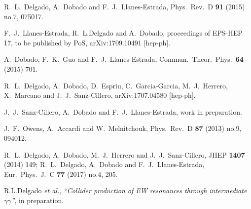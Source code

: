\documentclass{PoS}
\begin{document}
\begin{thebibliography}{99}



  R.~L.~Delgado, A.~Dobado and F.~J.~Llanes-Estrada,
  Phys.\ Rev.\ D {\bf 91} (2015) no.7,  075017.

  F.~J.~Llanes-Estrada, R.~L.Delgado and A.~Dobado,
  proceedings of EPS-HEP 17, to be published by PoS,
  arXiv:1709.10491 [hep-ph].


  A.~Dobado, F.~K.~Guo and F.~J.~Llanes-Estrada,
  Commun.\ Theor.\ Phys.\  {\bf 64} (2015) 701.



  R.~L.~Delgado, A.~Dobado, D.~Espriu, C.~Garcia-Garcia, M.~J.~Herrero, X.~Marcano and J.~J.~Sanz-Cillero,
  arXiv:1707.04580 [hep-ph].

J.~J.~Sanz-Cillero, A.~Dobado and F.~J.~Llanes-Estrada, 
work in preparation.

  J.~F.~Owens, A.~Accardi and W.~Melnitchouk,
  Phys.\ Rev.\ D {\bf 87} (2013) no.9,  094012.

  R.~L.~Delgado, A.~Dobado, M.~J.~Herrero and J.~J.~Sanz-Cillero,
  JHEP {\bf 1407} (2014) 149; 
  R.~L.~Delgado, A.~Dobado and F.~J.~Llanes-Estrada,
  Eur.\ Phys.\ J.\ C {\bf 77} (2017) no.4,  205.

 R.L.Delgado {\it et al.}, \emph{``Collider production of EW resonances through intermediate $\gamma\gamma$''}, in preparation.



\end{thebibliography}
\end{document}
